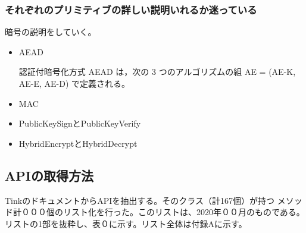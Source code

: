\subsubsection{それぞれのプリミティブの詳しい説明いれるか迷っている}
暗号の説明をしていく。
\begin{itemize}
\item AEAD

認証付暗号化方式 AEAD は，次の 3 つのアルゴリズムの組 AE = (AE-K, AE-E, AE-D) で定義される。

\item MAC
\item PublicKeySignとPublicKeyVerify
\item HybridEncryptとHybridDecrypt

\end{itemize}
\subsection{APIの取得方法}
Tinkのドキュメント\cite{Tink Cryptography}からAPIを抽出する。そのクラス（計167個）が持つ
メソッド計０００個のリスト化を行った。このリストは、2020年００月のものである。
リストの1部を抜粋し、表０に示す。リスト全体は付録Aに示す。


